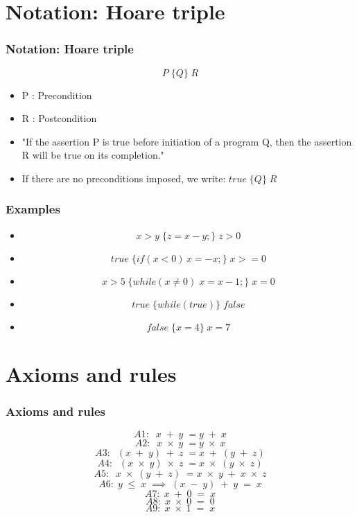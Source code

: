 \documentclass{beamer}
\begin{document}
\section{Notation: Hoare triple}
\begin{frame}
        \frametitle{Notation: Hoare triple}
$$  P \; \{Q\} \; R $$
\begin{itemize}
            \item P : Precondition
            \item R : Postcondition
\item "If the assertion P is true before initiation of a program Q, then the
assertion R will be true on its completion." 
\item If there are no preconditions imposed, we write: $true \;
\{Q\} \; R$
		\end {itemize}
\end{frame}

\begin{frame}
        \frametitle{Examples}
	\begin{itemize}
		\item $$ x > y \; \{ z = x-y;\} \; z > 0 $$
                \item $$ true \;  \{if(x<0) \, x = -x ;\} \; x >= 0 $$
		\item $$ x > 5 \; \{ while(x \neq 0) \; x = x - 1;\} \; x = 0 $$
                \item $$ true \;  \{while(true)\} \; false $$
		\item   $$ false \;  \{x = 4\} \; x = 7 $$
			\end{itemize}
\end{frame}


\section{Axioms and rules}
\begin{frame}
        \frametitle{Axioms and rules} 
	$$A1: \; \; x \; + \; y \; = y \; + \; x $$
	$$A2: \; \; x \; \times \; y \; = y \; \times \; x $$
        $$A3: \; \; (x \; + \; y) \; + \; z  \; = x \; + \;(y \; + \; z)  $$
        $$A4: \; \; (x \; \times \; y) \; \times \; z  \; = x \; \times \;(y \; \times \; z)  $$
	$$A5: \; \; x \; \times \; (y \; + \; z)  \; = x \; \times \;y \; + \; x \; \times \; z  $$
	$$A6: \; y \; \leq \; x \; \implies \; (x \; - \; y) \; + \; y \; = \; x $$
	$$A7: \; x \; + \; 0 \; = \; x $$
	 $$A8: \; x \; \times \; 0 \; = \; 0 $$
	 $$A9: \; x \; \times \; 1 \; = \; x $$

\end{frame}
\end{document}
